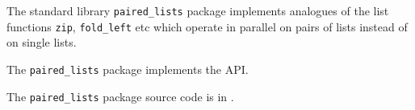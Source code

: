 
The standard library {\tt paired\_lists} package implements  
analogues of the list functions {\tt zip}, {\tt fold\_left} etc which operate in parallel 
on pairs of lists instead of on single lists.

The {\tt paired\_lists} package implements the  API.

The {\tt paired\_lists} package source code is in .




